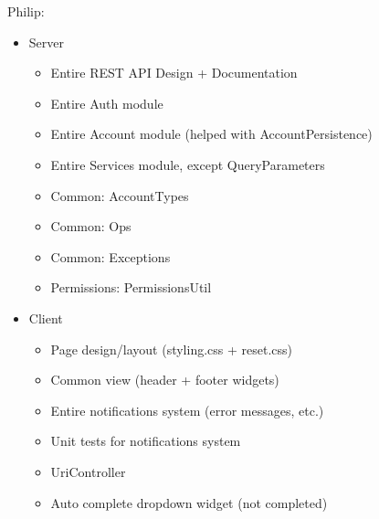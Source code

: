 Philip:
\begin{itemize}
	\item Server
	\begin{itemize}
		\item Entire REST API Design + Documentation
		\item Entire Auth module
		\item Entire Account module (helped with AccountPersistence)
		\item Entire Services module, except QueryParameters
		\item Common: AccountTypes
		\item Common: Ops
		\item Common: Exceptions
		\item Permissions: PermissionsUtil
	\end{itemize}
	\item Client
	\begin{itemize}
		\item Page design/layout (styling.css + reset.css)
		\item Common view (header + footer widgets)
		\item Entire notifications system (error messages, etc.)
		\item Unit tests for notifications system
		\item UriController
		\item Auto complete dropdown widget (not completed)
	\end{itemize}
\end{itemize} 